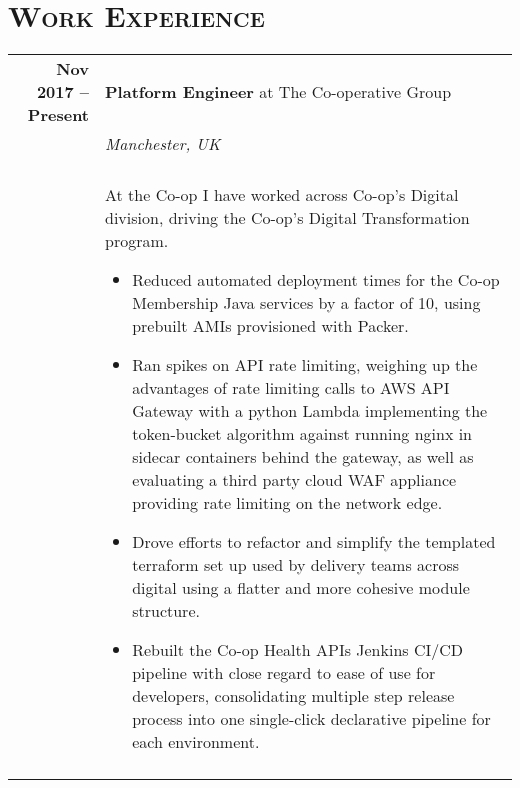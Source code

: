 \documentclass[a4paper,10pt]{article} %
\begin{document}
\section{\textsc{Work Experience}}
\centering
\begin{tabularx}{\textwidth}{r|X}

\textbf{Nov 2017 -- Present}        & \textbf{Platform Engineer} at The Co-operative Group \\
                                    & \emph{Manchester, UK} \\
                                    & \\
                                    & \footnotesize
    {At the Co-op I have worked across Co-op's Digital division, driving the
        Co-op's Digital Transformation program.
    \begin{itemize}
    \item Reduced automated deployment times for the Co-op Membership Java
        services by a factor of 10, using prebuilt AMIs provisioned with
        Packer.
    \item Ran spikes on API rate limiting, weighing up the advantages of rate
        limiting calls to AWS API Gateway with a python Lambda implementing the
        token-bucket algorithm against running nginx in sidecar containers
        behind the gateway, as well as evaluating a third party cloud WAF
        appliance providing rate limiting on the network edge.
    \item Drove efforts to refactor and simplify the templated terraform set up
        used by delivery teams across digital using a flatter and more cohesive
        module structure.
    \item Rebuilt the Co-op Health APIs Jenkins CI/CD pipeline with close
        regard to ease of use for developers, consolidating multiple step
        release process into one single-click declarative pipeline for each
        environment.
    \end{itemize}}\\

\multicolumn{2}{r}{} \\ %


\end{tabularx}
\end{document}
